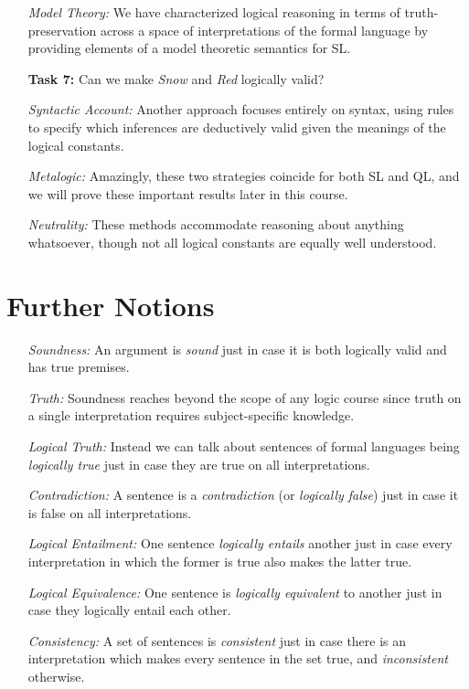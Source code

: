 \documentclass[a4paper, 11pt]{article} %
\begin{document}
\begin{enumerate}[leftmargin=1.2in,labelsep=.15in] %
  \item[\it Model Theory:] We have characterized logical reasoning in terms of truth-preservation across a space of interpretations of the formal language by providing elements of a model theoretic semantics for SL.
  \item[\bf Task 7:] Can we make \textit{Snow} and \textit{Red} logically valid?
  \item[\it Syntactic Account:] Another approach focuses entirely on syntax, using rules to specify which inferences are deductively valid given the meanings of the logical constants.
  \item[\it Metalogic:] Amazingly, these two strategies coincide for both SL and QL, and we will prove these important results later in this course.
  \item[\it Neutrality:] These methods accommodate reasoning about anything whatsoever, though not all logical constants are equally well understood.
\end{enumerate}


\section*{Further Notions}

\begin{enumerate}[leftmargin=1.2in,labelsep=.15in] %
  \item[\it Soundness:] An argument is \textit{sound} just in case it is both logically valid and has true premises.
  \item[\it Truth:] Soundness reaches beyond the scope of any logic course since truth on a single interpretation requires subject-specific knowledge.
  \item[\it Logical Truth:] Instead we can talk about sentences of formal languages being \textit{logically true} just in case they are true on all interpretations.
  \item[\it Contradiction:] A sentence is a \textit{contradiction} (or \textit{logically false}) just in case it is false on all interpretations.
  \item[\it Logical Entailment:] One sentence \textit{logically entails} another just in case every interpretation in which the former is true also makes the latter true.
  \item[\it Logical Equivalence:] One sentence is \textit{logically equivalent} to another just in case they logically entail each other.
  \item[\it Consistency:] A set of sentences is \textit{consistent} just in case there is an interpretation which makes every sentence in the set true, and \textit{inconsistent} otherwise.
\end{enumerate}
\end{document}
